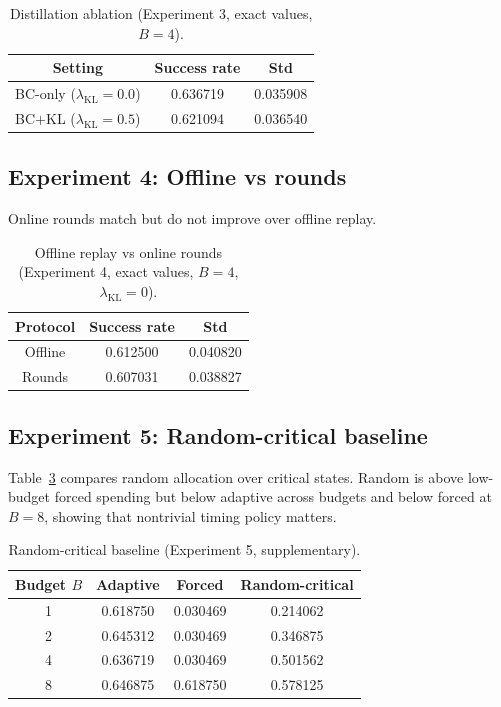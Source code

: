 \documentclass{article}
\begin{document}
\begin{table}[t]
\centering
\caption{Distillation ablation (Experiment 3, exact values, $B{=}4$).}
\label{tab:distill}
\begin{tabular}{ccc}
\toprule
Setting & Success rate & Std \\
\midrule
BC-only ($\lambda_{\text{KL}}{=}0.0$) & 0.636719 & 0.035908 \\
BC+KL ($\lambda_{\text{KL}}{=}0.5$) & 0.621094 & 0.036540 \\
\bottomrule
\end{tabular}
\end{table}

\subsection{Experiment 4: Offline vs rounds}
Online rounds match but do not improve over offline replay.

\begin{table}[t]
\centering
\caption{Offline replay vs online rounds (Experiment 4, exact values, $B{=}4$, $\lambda_{\text{KL}}{=}0$).}
\label{tab:offline_rounds}
\begin{tabular}{ccc}
\toprule
Protocol & Success rate & Std \\
\midrule
Offline & 0.612500 & 0.040820 \\
Rounds & 0.607031 & 0.038827 \\
\bottomrule
\end{tabular}
\end{table}

\subsection{Experiment 5: Random-critical baseline}
Table~\ref{tab:random_critical} compares random allocation over critical states. Random is above low-budget forced spending but below adaptive across budgets and below forced at $B{=}8$, showing that nontrivial timing policy matters.

\begin{table}[t]
\centering
\caption{Random-critical baseline (Experiment 5, supplementary).}
\label{tab:random_critical}
\begin{tabular}{cccc}
\toprule
Budget $B$ & Adaptive & Forced & Random-critical \\
\midrule
1 & 0.618750 & 0.030469 & 0.214062 \\
2 & 0.645312 & 0.030469 & 0.346875 \\
4 & 0.636719 & 0.030469 & 0.501562 \\
8 & 0.646875 & 0.618750 & 0.578125 \\
\bottomrule
\end{tabular}
\end{table}
\end{document}
